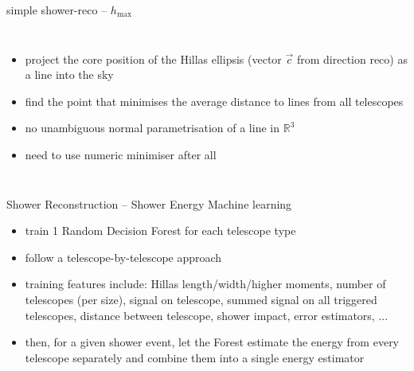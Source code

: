 \documentclass[8pt]{beamer}
\begin{document}
\begin{frame}{simple shower-reco -- $h_\mathrm{max}$}
\begin{columns}
                \begin{itemize}
                    \item project the core position of the Hillas ellipsis
                        (vector $\vec c$ from direction reco) as a line into the sky
                    \item find the point that minimises the average distance to
                        lines from all telescopes
                    \item no unambiguous normal parametrisation of a line in $\mathbb{R}^3$
                        \frownie
                    \item need to use numeric minimiser after all
                \end{itemize}

        \end{columns}
    \end{frame}



    \begin{frame}{Shower Reconstruction -- Shower Energy}
                 {Machine learning}
        \begin{itemize}
            \item train 1 Random Decision Forest for each telescope type
            \item follow a telescope-by-telescope approach
            \item training features include: Hillas length/width/higher moments,
                number of telescopes (per size), signal on telescope,
                summed signal on all triggered telescopes, distance between telescope,
                shower impact, error estimators, ...
            \medskip
            \item then, for a given shower event, let the Forest estimate the energy from
                every telescope separately and combine them into a single energy
                estimator
        \end{itemize}
        \setlength{\figureheight}{4.5cm}
        \setlength{\figurewidth}{4.5cm}
%         
        
    \end{frame}
\end{document}
